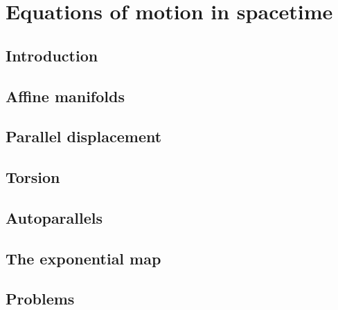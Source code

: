 \chapter{Equations of motion in spacetime}

\section{Introduction}

\section{Affine manifolds}

\section{Parallel displacement}

\section{Torsion}

\section{Autoparallels}

\section{The exponential map}

\section{Problems}
